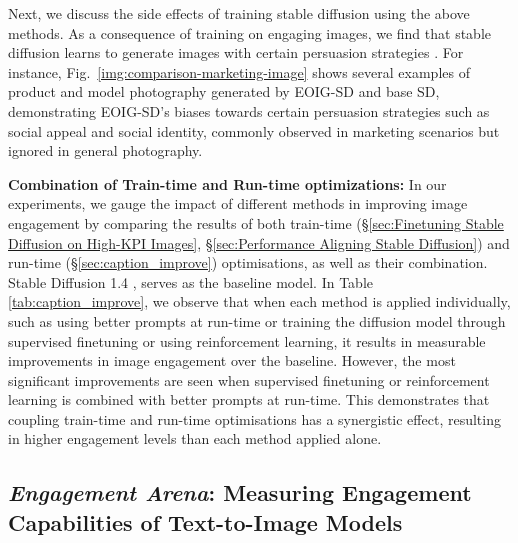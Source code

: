  
 Next, we discuss the side effects of training stable diffusion using the above methods.
 As a consequence of training on engaging images, we find that stable diffusion learns to generate images with certain persuasion strategies \cite{singla2022persuasion}. For instance, Fig.~\ref{img:comparison-marketing-image} shows several examples of product and model photography generated by EOIG-SD and base SD, demonstrating EOIG-SD's biases towards certain persuasion strategies such as social appeal and social identity, commonly observed in marketing scenarios \cite{singla2022persuasion} but ignored in general photography.


\textbf{Combination of Train-time and Run-time optimizations:} In our experiments, we gauge the impact of different methods in improving image engagement by comparing the results of both train-time (\S\ref{sec:Finetuning Stable Diffusion on High-KPI Images}, \S\ref{sec:Performance Aligning Stable Diffusion}) and run-time (\S\ref{sec:caption_improve}) optimisations, as well as their combination.
Stable Diffusion 1.4 \cite{rombach2022high}, serves as the baseline model. In Table \ref{tab:caption_improve}, we observe that when each method is applied individually, such as using better prompts at run-time or training the diffusion model through supervised finetuning or using reinforcement learning, it results in measurable improvements in image engagement over the baseline.
However, the most significant improvements are seen when supervised finetuning or reinforcement learning is combined with better prompts at run-time.
This demonstrates that coupling train-time and run-time optimisations has a synergistic effect, resulting in higher engagement levels than each method applied alone.


 
 
 \subsection{\textit{Engagement Arena}: Measuring Engagement Capabilities of Text-to-Image Models}
 \label{sec:image_persuasion_arena}

